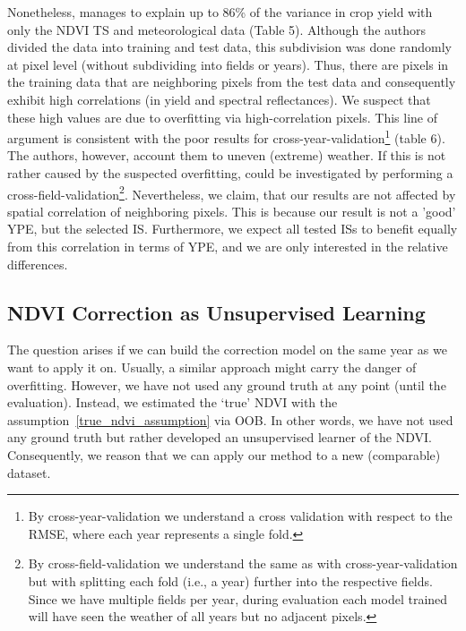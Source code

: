 {{        Nonetheless, \cite{perichPixelbasedCropYield2022} manages to explain up to 86\% of the variance in crop yield with only the NDVI TS and meteorological data (Table 5).  Although the authors divided the data into training and test data, this subdivision was done randomly at pixel level (without subdividing into fields or years). Thus, there are pixels in the training data that are neighboring pixels from the test data and consequently exhibit high correlations (in yield and spectral reflectances). We suspect that these high values are due to overfitting via high-correlation pixels. This line of argument is consistent with the poor results for cross-year-validation\footnote{By cross-year-validation we understand a cross validation with respect to the RMSE, where each year represents a single fold.} (table 6). The authors, however, account them to uneven (extreme) weather.  If this is not rather caused by the suspected overfitting, could be investigated by performing a cross-field-validation\footnote{By cross-field-validation we understand the same as with cross-year-validation but with splitting each fold (i.e., a year) further into the respective fields. Since we have multiple fields per year, during evaluation each model trained will have seen the weather of all years but no adjacent pixels.}.%
        Nevertheless, we claim, that our results are not affected by spatial correlation of neighboring pixels. This is because our result is not a 'good' YPE, but the selected IS. Furthermore, we expect all tested ISs to benefit equally from this correlation in terms of YPE, and we are only interested in the relative differences.  
    }

    \subsection{NDVI Correction as Unsupervised Learning}
        The question arises if we can build the correction model on the same year as we want to apply it on. Usually, a similar approach might carry the danger of overfitting. However, we have not used any ground truth at any point (until the evaluation). Instead, we estimated the `true' NDVI with the assumption~\ref{true_ndvi_assumption} via OOB. In other words, we have not used any ground truth but rather developed an unsupervised learner of the NDVI. Consequently, we reason that we can apply our method to a new (comparable) dataset.
}

